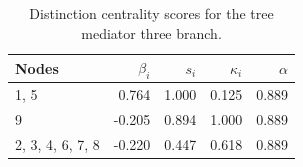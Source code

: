\begin{table}
\centering
\caption{\label{tab:treemediator3}Distinction centrality scores for the tree mediator three branch.}
\centering
\begin{tabular}[t]{lrrrr}
\toprule
Nodes & $\beta_i$ & $s_i$ & $\kappa_i$ & $\alpha$\\
\midrule
1, 5 & 0.764 & 1.000 & 0.125 & 0.889\\
9 & -0.205 & 0.894 & 1.000 & 0.889\\
2, 3, 4, 6, 7, 8 & -0.220 & 0.447 & 0.618 & 0.889\\
\bottomrule
\end{tabular}
\end{table}
